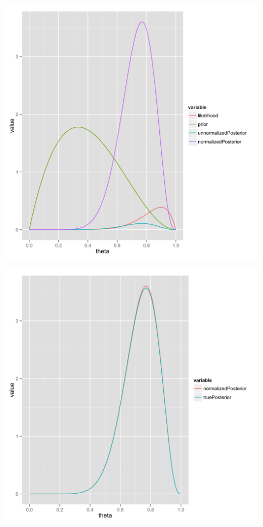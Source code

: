 \documentclass{beamer}
\begin{document}
\frame
{
  \begin{center}
    \includegraphics[scale = 0.1]{grid_approximation.png}
  \end{center}
}

\frame
{
  \begin{center}
    \includegraphics[scale = 0.1]{grid_quality.png}
  \end{center}
}
\end{document}
